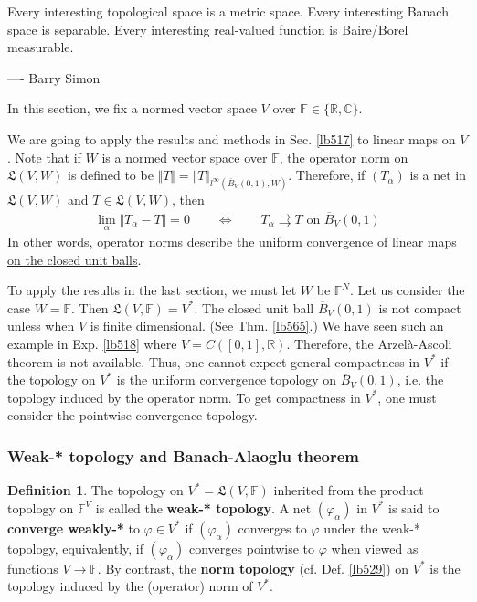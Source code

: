 \documentclass[12pt,b5paper,notitlepage]{article}
\theoremstyle{definition}
\newtheorem{df}{Definition}[section]
\theoremstyle{plain}
\newcommand{\fk}{\mathfrak}
\newcommand{\ovl}{\overline}
\newcommand{\Cbb}{\mathbb C}
\newcommand{\Rbb}{\mathbb R}
\newcommand{\Fbb}{\mathbb F}
\numberwithin{equation}{section}
\begin{document}
\begin{displayquote}
\small Every interesting topological space is a metric space. Every interesting Banach space is separable. Every interesting real-valued function is Baire/Borel measurable.

\hfill ---- Barry Simon \cite[Preface of Part 1]{Sim-R}
\end{displayquote}


In this section, we fix a normed vector space $V$ over $\Fbb\in\{\Rbb,\Cbb\}$.

We are going to apply the results and methods in Sec. \ref{lb517} to linear maps on $V$. Note that if $W$ is a normed vector space over $\Fbb$, the operator norm on $\fk L(V,W)$ is defined to be $\Vert T\Vert=\Vert T\Vert_{l^\infty(\ovl B_V(0,1),W)}$. Therefore, if $(T_\alpha)$ is a net in $\fk L(V,W)$ and $T\in\fk L(V,W)$, then
\begin{align}
\lim_\alpha \Vert T_\alpha-T\Vert=0\qquad\Longleftrightarrow\qquad T_\alpha\rightrightarrows T\text{ on }\ovl B_V(0,1) 
\end{align}
In other words, \uline{operator norms describe the uniform convergence of linear maps on the closed unit balls}.

To apply the results in the last section, we must let $W$ be $\Fbb^N$. Let us consider the case $W=\Fbb$. Then $\fk L(V,\Fbb)=V^*$. The closed unit ball $\ovl B_V(0,1)$ is not compact unless when $V$ is finite dimensional. (See Thm. \ref{lb565}.) We have seen such an example in Exp. \ref{lb518} where $V=C([0,1],\Rbb)$. Therefore, the Arzel\`a-Ascoli theorem is not available. Thus, one cannot expect general compactness in $V^*$ if the topology on $V^*$ is the uniform  convergence topology on $\ovl B_V(0,1)$, i.e. the topology induced by the operator norm. To get compactness in $V^*$, one must consider the pointwise convergence topology.



\subsubsection{Weak-* topology and Banach-Alaoglu theorem}


\begin{df}
The topology on $V^*=\fk L(V,\Fbb)$ inherited from the product topology on $\Fbb^V$ is called the \textbf{weak-* topology}.  A net $(\varphi_\alpha)$ in $V^*$ is said to \textbf{converge weakly-*} to $\varphi\in V^*$ if $(\varphi_\alpha)$ converges to $\varphi$ under the weak-* topology, equivalently, if $(\varphi_\alpha)$ converges pointwise to $\varphi$ when viewed as functions $V\rightarrow\Fbb$. By contrast, the \textbf{norm topology}  (cf. Def. \ref{lb529}) on $V^*$ is the topology induced by the (operator) norm of $V^*$.
\end{df}
\end{document}
